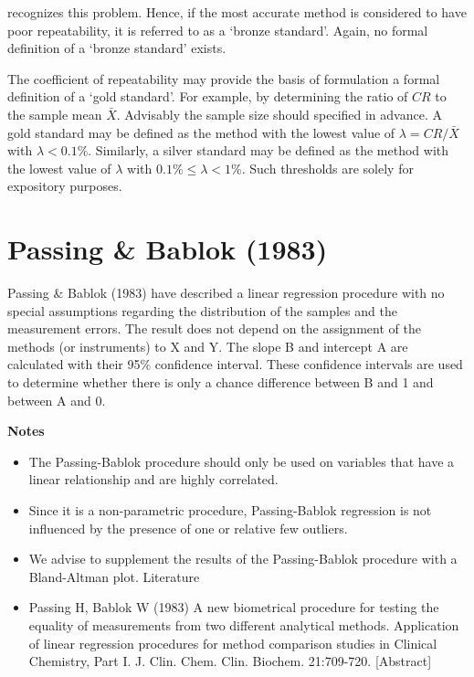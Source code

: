 \documentclass[MAIN.tex]{subfiles}
\begin{document}
\citet{dunnSEME} recognizes this problem. Hence, if the most accurate method is considered to have poor repeatability, it is referred to as a `bronze standard'.  Again, no formal definition of a `bronze standard' exists.

The coefficient of repeatability may provide the basis of formulation a formal definition of a `gold standard'. For example, by determining the ratio of $CR$ to the sample mean $\bar{X}$. Advisably the sample size should specified in advance. A gold standard may be defined as the method with the lowest value of $\lambda = CR /\bar{X}$ with $\lambda < 0.1\%$. Similarly, a silver standard may be defined as the method with the lowest value of $\lambda $ with $0.1\% \leq \lambda < 1\%$. Such thresholds are solely for expository purposes.
\section*{Passing \& Bablok (1983)}
Passing \& Bablok (1983) have described a linear regression procedure with no special assumptions regarding the distribution of the samples and the measurement errors. The result does not depend on the assignment of the methods (or instruments) to X and Y. The slope B and intercept A are calculated with their 95\% confidence interval. These confidence intervals are used to determine whether there is only a chance difference between B and 1 and between A and 0.


\textbf{Notes}
\begin{itemize}
\item The Passing-Bablok procedure should only be used on variables that have a linear relationship and are highly correlated.
\item Since it is a non-parametric procedure, Passing-Bablok regression is not influenced by the presence of one or relative few outliers.
\item We advise to supplement the results of the Passing-Bablok procedure with a Bland-Altman plot.
Literature

\item Passing H, Bablok W (1983) A new biometrical procedure for testing the equality of measurements from two different analytical methods. Application of linear regression procedures for method comparison studies in Clinical Chemistry, Part I. J. Clin. Chem. Clin. Biochem. 21:709-720. [Abstract]
\end{itemize}
\end{document}
